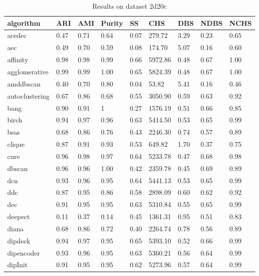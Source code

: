\begin{table}[H]
\centering
\caption{Results on dataset 2d20c}
\label{tab:params:2d20c}
\begin{tabular}{|l|l|l|l|l|l|l|l|l|}
\hline
algorithm & ARI & AMI & Purity & SS & CHS & DBS & NDBS & NCHS \\
\hline
acedec & 0.47 & 0.71 & 0.64 & 0.07 & 279.72 & 3.29 & 0.23 & 0.65 \\
\hline
aec & 0.49 & 0.70 & 0.59 & 0.08 & 174.70 & 5.07 & 0.16 & 0.60 \\
\hline
affinity & 0.98 & 0.98 & 0.99 & 0.66 & 5972.86 & 0.48 & 0.67 & 1.00 \\
\hline
agglomerative & 0.99 & 0.99 & 1.00 & 0.65 & 5824.39 & 0.48 & 0.67 & 1.00 \\
\hline
amddbscan & 0.40 & 0.70 & 0.80 & 0.04 & 53.82 & 5.41 & 0.16 & 0.46 \\
\hline
autoclustering & 0.67 & 0.86 & 0.68 & 0.55 & 3050.90 & 0.59 & 0.63 & 0.92 \\
\hline
bang & 0.90 & 0.91 & 1 & 0.27 & 1576.19 & 0.51 & 0.66 & 0.85 \\
\hline
birch & 0.94 & 0.97 & 0.96 & 0.63 & 5414.50 & 0.53 & 0.65 & 0.99 \\
\hline
bsas & 0.68 & 0.86 & 0.76 & 0.43 & 2246.30 & 0.74 & 0.57 & 0.89 \\
\hline
clique & 0.87 & 0.91 & 0.93 & 0.53 & 649.82 & 1.70 & 0.37 & 0.75 \\
\hline
cure & 0.96 & 0.98 & 0.97 & 0.64 & 5233.78 & 0.47 & 0.68 & 0.98 \\
\hline
dbscan & 0.96 & 0.96 & 1.00 & 0.42 & 2359.78 & 0.45 & 0.69 & 0.89 \\
\hline
dcn & 0.93 & 0.96 & 0.95 & 0.64 & 5441.13 & 0.53 & 0.65 & 0.99 \\
\hline
ddc & 0.87 & 0.95 & 0.86 & 0.58 & 2898.09 & 0.60 & 0.62 & 0.92 \\
\hline
dec & 0.91 & 0.95 & 0.95 & 0.63 & 5310.84 & 0.55 & 0.65 & 0.99 \\
\hline
deepect & 0.11 & 0.37 & 0.14 & 0.45 & 1361.31 & 0.95 & 0.51 & 0.83 \\
\hline
diana & 0.68 & 0.86 & 0.72 & 0.40 & 2264.74 & 0.78 & 0.56 & 0.89 \\
\hline
dipdeck & 0.94 & 0.97 & 0.95 & 0.65 & 5393.10 & 0.52 & 0.66 & 0.99 \\
\hline
dipencoder & 0.93 & 0.96 & 0.95 & 0.63 & 5360.21 & 0.56 & 0.64 & 0.99 \\
\hline
dipInit & 0.91 & 0.95 & 0.95 & 0.62 & 5273.96 & 0.57 & 0.64 & 0.99 \\

\end{tabular}
\end{table}
